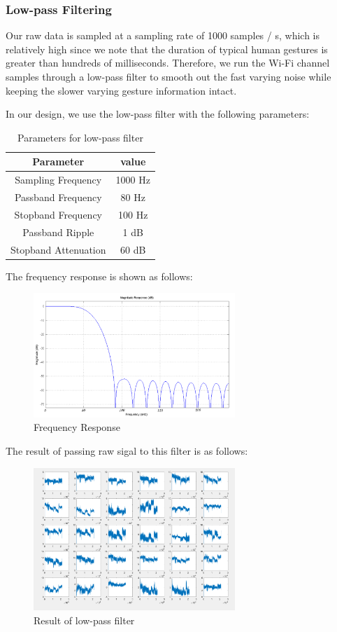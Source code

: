 \documentclass[conference]{IEEEtran}
\begin{document}
\subsubsection{Low-pass Filtering}
Our raw data is sampled at a sampling rate of 1000 samples / s, which is relatively high since we note that the duration of typical human gestures is greater than hundreds of milliseconds. Therefore, we run the Wi-Fi channel samples through a low-pass filter to smooth out the fast varying noise while keeping the slower varying gesture information intact.

In our design, we use the low-pass filter with the following parameters:
\begin{table}[H]
\centering
\begin{tabular}{|c|c|}
\hline
Parameter & value \\
\hline
\hline
Sampling Frequency & 1000 Hz \\
\hline
Passband Frequency & 80 Hz \\
\hline
Stopband Frequency & 100 Hz \\
\hline
Passband Ripple & 1 dB \\
\hline
Stopband Attenuation & 60 dB \\
\hline
\hline
\end{tabular}
\caption{Parameters for low-pass filter}
\end{table}
The frequency response is shown as follows:
\begin{figure}[H]
\centering
\includegraphics[width=3in]{FR.png}
\caption{Frequency Response}
\end{figure}
The result of passing raw sigal to this filter is as follows:
\begin{figure}[H]
\centering
\includegraphics[width=3in]{LPF.png}
\caption{Result of low-pass filter}
\end{figure}
\end{document}
